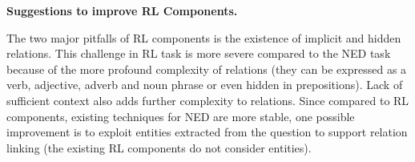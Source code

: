 \documentclass[sigconf,edbt]{acmart-edbt2019}
\newcommand{\qq}[1]{``#1''}
\begin{document}
{\bf Suggestions to improve RL Components.} \begin{inparaenum}[\itshape i\upshape)] 
The two major pitfalls of RL components is the existence of implicit and hidden relations.
This challenge in RL task is more severe compared to the NED task because of the more profound complexity of relations (they can be expressed as a verb, adjective, adverb and noun phrase or even hidden in prepositions).
Lack of sufficient context also adds further complexity to relations. Since compared to RL components, existing techniques for NED are more stable, one possible improvement is to exploit entities extracted from the question to support relation linking (the existing RL components do not consider entities).
\end{inparaenum}
~\\
\end{document}
